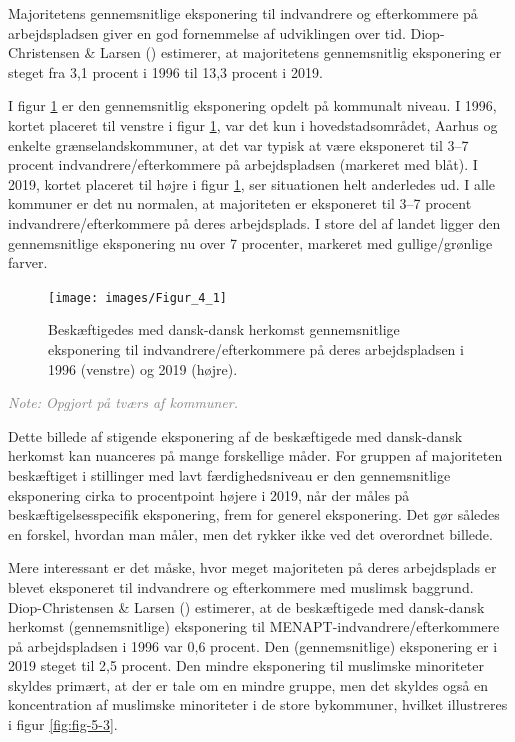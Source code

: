 \documentclass[
]{book}
\begin{document}
Majoritetens gennemsnitlige eksponering til indvandrere og efterkommere på arbejdspladsen giver en god fornemmelse af udviklingen over tid. Diop-Christensen \& Larsen () estimerer, at majoritetens gennemsnitlig eksponering er steget fra 3,1 procent i 1996 til 13,3 procent i 2019.

I figur \ref{fig:fig-5-2} er den gennemsnitlig eksponering opdelt på kommunalt niveau. I 1996, kortet placeret til venstre i figur \ref{fig:fig-5-2}, var det kun i hovedstadsområdet, Aarhus og enkelte grænselandskommuner, at det var typisk at være eksponeret til 3--7 procent indvandrere/efterkommere på arbejdspladsen (markeret med blåt). I 2019, kortet placeret til højre i figur \ref{fig:fig-5-2}, ser situationen helt anderledes ud. I alle kommuner er det nu normalen, at majoriteten er eksponeret til 3--7 procent indvandrere/efterkommere på deres arbejdsplads. I store del af landet ligger den gennemsnitlige eksponering nu over 7 procenter, markeret med gullige/grønlige farver.

\newpage

\begin{figure}
\texttt{[image: images/Figur\_4\_1]} \caption{Beskæftigedes med dansk-dansk herkomst gennemsnitlige eksponering til indvandrere/efterkommere på deres arbejdspladsen i 1996 (venstre) og 2019 (højre).}\label{fig:fig-5-2}
\end{figure}

\begin{footnotesize}\textit{\textcolor{gray}{
Note: Opgjort på tværs af kommuner.
}}
\end{footnotesize}

Dette billede af stigende eksponering af de beskæftigede med dansk-dansk herkomst kan nuanceres på mange forskellige måder. For gruppen af majoriteten beskæftiget i stillinger med lavt færdighedsniveau er den gennemsnitlige eksponering cirka to procentpoint højere i 2019, når der måles på beskæftigelsesspecifik eksponering, frem for generel eksponering. Det gør således en forskel, hvordan man måler, men det rykker ikke ved det overordnet billede.

Mere interessant er det måske, hvor meget majoriteten på deres arbejdsplads er blevet eksponeret til indvandrere og efterkommere med muslimsk baggrund. Diop-Christensen \& Larsen () estimerer, at de beskæftigede med dansk-dansk herkomst (gennemsnitlige) eksponering til MENAPT-indvandrere/efterkommere på arbejdspladsen i 1996 var 0,6 procent. Den (gennemsnitlige) eksponering er i 2019 steget til 2,5 procent. Den mindre eksponering til muslimske minoriteter skyldes primært, at der er tale om en mindre gruppe, men det skyldes også en koncentration af muslimske minoriteter i de store bykommuner, hvilket illustreres i figur \ref{fig:fig-5-3}.
\end{document}
